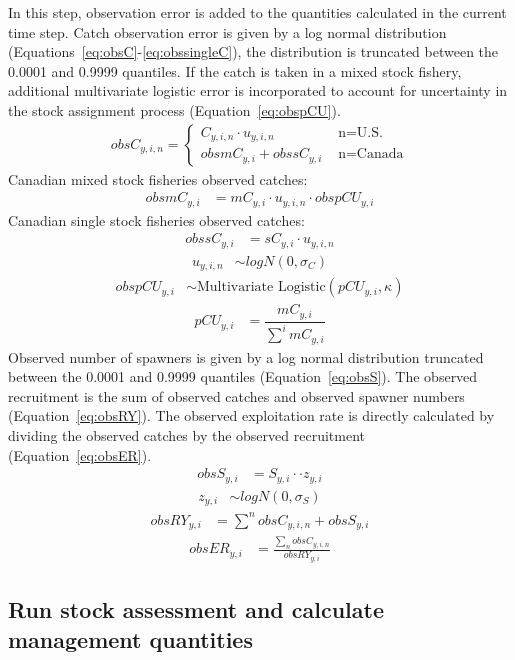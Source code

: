 \documentclass[11pt]{book}
\begin{document}
In this step, observation error is added to the quantities calculated in the current time step. Catch observation error is given by a log normal distribution (Equations~\ref{eq:obsC}-\ref{eq:obssingleC}), the distribution is truncated between the 0.0001 and 0.9999 quantiles. If the catch is taken in a mixed stock fishery, additional multivariate logistic error is incorporated to account for uncertainty in the stock assignment process (Equation~\ref{eq:obspCU}).
\begin{align}
obsC_{y,i,n} =
 \begin{cases}
   C_{y,i,n} \cdot u_{y,i,n} &\text{ n=U.S.}\\
   {obsmC}_{y,i} +{obssC}_{y,i} &\text{ n=Canada}
  \end{cases}
  \label{eq:obsC}
\end{align}
Canadian mixed stock fisheries observed catches: \begin{align}
  {obsmC}_{y,i} &= {mC}_{y,i} \cdot u_{y,i,n} \cdot obspCU_{y,i} 
  \label{eq:obsmixC}
\end{align}
Canadian single stock fisheries observed catches:
\begin{align}
  {obssC}_{y,i} &= {sC}_{y,i} \cdot u_{y,i,n}
  \label{eq:obssingleC}
\end{align}
\begin{align}
u_{y,i,n} &\sim logN(0,\sigma_{C})
\end{align}
\begin{align}
  obspCU_{y,i}  &\sim \text{Multivariate Logistic}(pCU_{y,i},\kappa)
  \label{eq:obspCU}
\end{align}
\begin{align}
  pCU_{y,i} &= \dfrac{{mC}_{y,i}}{\sum^i {mC}_{y,i}}
\end{align}
Observed number of spawners is given by a log normal distribution truncated between the 0.0001 and 0.9999 quantiles (Equation~\ref{eq:obsS}). The observed recruitment is the sum of observed catches and observed spawner numbers (Equation~\ref{eq:obsRY}). The observed exploitation rate is directly calculated by dividing the observed catches by the observed recruitment (Equation~\ref{eq:obsER}).
\begin{align}
\label{eq:obsS}
  obsS_{y,i} &= S_{y,i} \cdot  \cdot z_{y,i}
\end{align}
\begin{align}
\label{eq:obsSz}
  z_{y,i} &\sim logN(0,\sigma_{S})
\end{align}
\begin{align}
  obsRY_{y,i} &= \sum^{n}obsC_{y,i,n} + obsS_{y,i}
   \label{eq:obsRY}
\end{align}
\begin{align}
  obsER_{y,i} &= \frac{\sum_{n}obsC_{y,i,n}}{obsRY_{y,i}}
  \label{eq:obsER}
\end{align}
\hypertarget{run-stock-assessment-and-calculate-management-quantities}{%
\subsection{Run stock assessment and calculate management quantities}\label{run-stock-assessment-and-calculate-management-quantities}}
\end{document}
